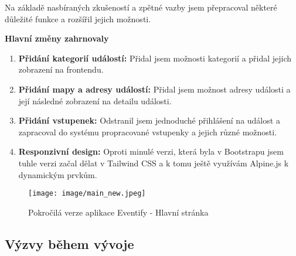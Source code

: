\documentclass[12pt, a4paper,
twoside,        %
openright
]{report}
\begin{document}
Na základě nasbíraných zkušeností a zpětné vazby jsem přepracoval některé důležité funkce a rozšířil jejich možnosti.

\textbf{Hlavní změny zahrnovaly}

\begin{enumerate}
	\item \textbf{Přidání kategorií událostí:} Přidal jsem možnosti kategorií a přidal jejich zobrazení na frontendu.
	\item \textbf{Přidání mapy a adresy událostí:} Přidal jsem možnost adresy události a její následné zobrazení na detailu události.
	\item \textbf{Přidání vstupenek:} Odstranil jsem jednoduché přihlášení na událost a zapracoval do systému propracované vstupenky a jejich různé možnosti.
	\item \textbf{Responzivní design:} Oproti minulé verzi, která byla v Bootstrapu jsem tuhle verzi začal dělat v Tailwind CSS a k tomu ještě využívám Alpine.js k dynamickým prvkům.
\end{enumerate}

\begin{figure}[h!]
	\centering %
	\texttt{[image: image/main\_new.jpeg]} %
	\caption{Pokročilá verze aplikace Eventify - Hlavní stránka} %
	\label{fig:main} %
\end{figure}

\clearpage

\subsection{Výzvy během vývoje}
\end{document}
